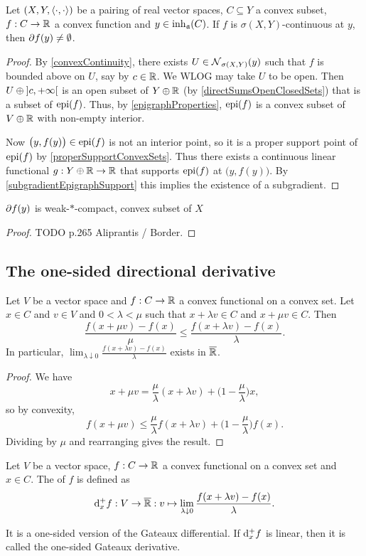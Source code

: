 \begin{proposition} \label{existenceSubdifferential}
Let $\sSet{X,Y,\pair{\cdot,\cdot}}$ be a pairing of real vector spaces, $C\subseteq Y$ a convex subset, $f: C\to \mathbb{R}$ a convex function and $y\in \operatorname{inh}_\mathfrak{a}(C)$. If $f$ is $\sigma(X,Y)$-continuous at $y$, then $\partial f(y) \neq \emptyset$.
\end{proposition}
\begin{proof}
By \ref{convexContinuity}, there exists $U\in \operatorname{\mathcal{N}}_{\sigma(X,Y)}(y)$ such that $f$ is bounded above on $U$, say by $c\in \mathbb{R}$. We WLOG may take $U$ to be open. Then $U\oplus \interval[o]{c, +\infty}$ is an open subset of $Y\oplus \mathbb{R}$ (by \ref{directSumsOpenClosedSets}) that is a subset of $\operatorname{epi}(f)$. Thus, by \ref{epigraphProperties}, $\operatorname{epi}(f)$ is a convex subset of $V\oplus \mathbb{R}$ with non-empty interior.

Now $\big(y,f(y)\big) \in \operatorname{epi}(f)$ is not an interior point, so it is a proper support point of $\operatorname{epi}(f)$ by \ref{properSupportConvexSets}. Thus there exists a continuous linear functional $g: Y\oplus \mathbb{R}\to \mathbb{R}$ that supports $\operatorname{epi}(f)$ at $\big(y,f(y)\big)$. By \ref{subgradientEpigraphSupport} this implies the existence of a subgradient.
\end{proof}

\begin{proposition}
$\partial f(y)$ is weak-$*$-compact, convex subset of $X$
\end{proposition}
\begin{proof}
TODO p.265 Aliprantis / Border.
\end{proof}


\subsection{The one-sided directional derivative}
\begin{lemma} \label{oneSidedDirectionalDerivativeLemma}
Let $V$ be a vector space and $f: C\to \mathbb{R}$ a convex functional on a convex set. Let $x\in C$ and $v\in V$ and $0<\lambda <\mu$ such that $x+\lambda v\in C$ and $x+\mu v\in C$. Then
\[ \frac{f(x+\mu v) - f(x)}{\mu} \leq \frac{f(x+\lambda v)-f(x)}{\lambda}. \]
In particular, $\lim_{\lambda\downarrow 0}\frac{f(x+\lambda v)-f(x)}{\lambda}$ exists in $\overline{\mathbb{R}}$.
\end{lemma}
\begin{proof}
We have
\[ x + \mu v = \frac{\mu}{\lambda}(x+ \lambda v) + \Big(1 -\frac{\mu}{\lambda}\Big)x, \]
so by convexity,
\[ f(x+\mu v) \leq \frac{\mu}{\lambda}f(x+ \lambda v) + \Big(1 -\frac{\mu}{\lambda}\Big)f(x). \]
Dividing by $\mu$ and rearranging gives the result.
\end{proof}
\begin{definition}
Let $V$ be a vector space, $f: C\to \mathbb{R}$ a convex functional on a convex set and $x\in C$. The  of $f$ is defined as
\[ \operatorname{d \!}{^+_xf}: V \to \overline{\mathbb{R}}: v \mapsto \lim_{\lambda\downarrow 0} \frac{f(x+\lambda v)-f(x)}{\lambda}. \]
\end{definition}
It is a one-sided version of the Gateaux differential. If $\operatorname{d \!}{^+_xf}$ is linear, then it is called the one-sided Gateaux derivative.

